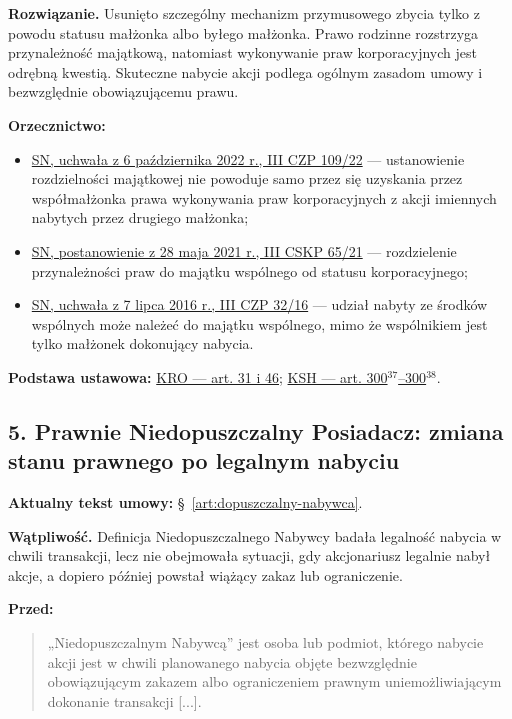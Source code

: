 \documentclass[12pt,a4paper]{report}
\begin{document}
\textbf{Rozwiązanie.} Usunięto szczególny mechanizm przymusowego zbycia tylko z powodu statusu małżonka albo byłego małżonka. Prawo rodzinne rozstrzyga przynależność majątkową, natomiast wykonywanie praw korporacyjnych jest odrębną kwestią. Skuteczne nabycie akcji podlega ogólnym zasadom umowy i bezwzględnie obowiązującemu prawu.

\textbf{Orzecznictwo:}
\begin{itemize}
  \item \href{https://www.sn.pl/sprawy/SitePages/Zagadnienia_prawne_SN.aspx?ItemSID=1718-301f4741-66aa-4980-b9fa-873e90506a11\&ListName=Zagadnienia_prawne\&Rok=2022}{SN, uchwała z 6 października 2022 r., III CZP 109/22} --- ustanowienie rozdzielności majątkowej nie powoduje samo przez się uzyskania przez współmałżonka prawa wykonywania praw korporacyjnych z akcji imiennych nabytych przez drugiego małżonka;
  \item \href{https://www.sn.pl/sites/orzecznictwo/OrzeczeniaHTML/iii\%20cskp\%2065-21-1.docx.html}{SN, postanowienie z 28 maja 2021 r., III CSKP 65/21} --- rozdzielenie przynależności praw do majątku wspólnego od statusu korporacyjnego;
  \item \href{https://www.sn.pl/sprawy/SitePages/Zagadnienia_prawne_SN.aspx?ItemSID=786-16544171-be1b-4089-b74b-413997467af2\&ListName=Zagadnienia_prawne\&Rok=2016}{SN, uchwała z 7 lipca 2016 r., III CZP 32/16} --- udział nabyty ze środków wspólnych może należeć do majątku wspólnego, mimo że wspólnikiem jest tylko małżonek dokonujący nabycia.
\end{itemize}

\textbf{Podstawa ustawowa:} \href{https://eli.gov.pl/eli/DU/2026/236/ogl}{KRO --- art. 31 i 46}; \href{https://eli.gov.pl/api/acts/DU/2024/18/text.html}{KSH --- art. 300$^{37}$--300$^{38}$}.

\subsection*{5. Prawnie Niedopuszczalny Posiadacz: zmiana stanu prawnego po legalnym nabyciu}
\textbf{Aktualny tekst umowy:} §~\ref{art:dopuszczalny-nabywca}.

\textbf{Wątpliwość.} Definicja Niedopuszczalnego Nabywcy badała legalność nabycia w chwili transakcji, lecz nie obejmowała sytuacji, gdy akcjonariusz legalnie nabył akcje, a dopiero później powstał wiążący zakaz lub ograniczenie.

\textbf{Przed:}
\begin{quote}\small
„Niedopuszczalnym Nabywcą” jest osoba lub podmiot, którego nabycie akcji jest w chwili planowanego nabycia objęte bezwzględnie obowiązującym zakazem albo ograniczeniem prawnym uniemożliwiającym dokonanie transakcji [...].
\end{quote}
\end{document}
